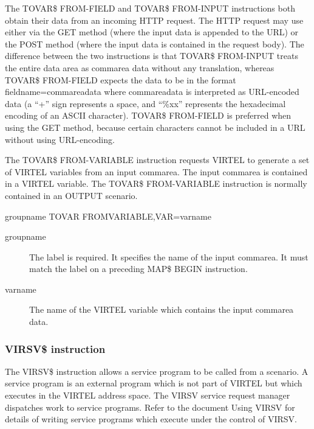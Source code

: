 \documentclass[letterpaper,10pt,english]{sphinxmanual}
\begin{document}
The TOVAR\$ FROM-FIELD and TOVAR\$ FROM-INPUT instructions both obtain their data from an incoming HTTP
request. The HTTP request may use either via the GET method (where the input data is appended to the URL) or the
POST method (where the input data is contained in the request body). The difference between the two instructions is
that TOVAR\$ FROM-INPUT treats the entire data area as commarea data without any translation, whereas TOVAR\$
FROM-FIELD expects the data to be in the format fieldname=commareadata where commareadata is interpreted as
URL-encoded data (a “+” sign represents a space, and “\%xx” represents the hexadecimal encoding of an ASCII
character). TOVAR\$ FROM-FIELD is preferred when using the GET method, because certain characters cannot be
included in a URL without using URL-encoding.


The TOVAR\$ FROM-VARIABLE instruction requests VIRTEL to generate a set of VIRTEL variables from an input
commarea. The input commarea is contained in a VIRTEL variable. The TOVAR\$ FROM-VARIABLE instruction is normally
contained in an OUTPUT scenario.

\begin{sphinxVerbatim}[commandchars=\\\{\}]
groupname TOVAR\PYGZdl{} FROM\PYGZhy{}VARIABLE,VAR=\PYGZsq{}varname\PYGZsq{}
\end{sphinxVerbatim}
\begin{description}
\item[{groupname}] \leavevmode
The label is required. It specifies the name of the input commarea. It must match the label on a preceding MAP\$ BEGIN instruction.

\item[{varname}] \leavevmode
The name of the VIRTEL variable which contains the input commarea data.

\end{description}


\subsubsection{VIRSV\$ instruction}
\label{\detokenize{User_Guide:virsv-instruction}}
The VIRSV\$ instruction allows a service program to be called from a scenario. A service program is an external program
which is not part of VIRTEL but which executes in the VIRTEL address space. The VIRSV service request manager
dispatches work to service programs. Refer to the document Using VIRSV for details of writing service programs which
execute under the control of VIRSV.
\end{document}

